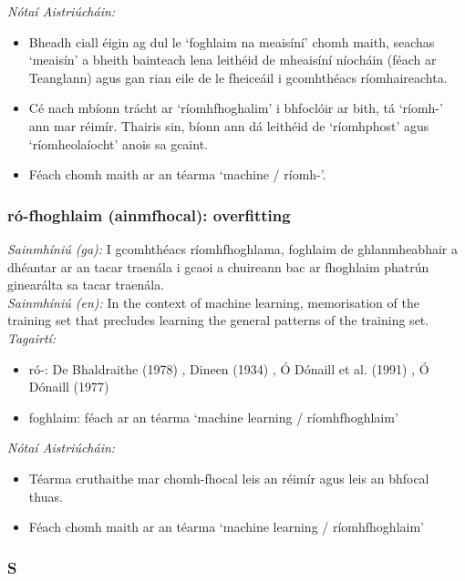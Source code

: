  \noindent \textit{Nótaí Aistriúcháin:}
\begin{itemize}
	\item Bheadh ciall éigin ag dul le `foghlaim na meaisíní' chomh maith, seachas `meaisín' a bheith bainteach lena leithéid de mheaisíní níocháin (féach ar Teanglann) agus gan rian eile de le fheiceáil i gcomhthéacs ríomhaireachta.
	\item Cé nach mbíonn trácht ar `ríomhfhoghalim' i bhfoclóir ar bith, tá `ríomh-' ann mar réimír. Thairis sin, bíonn ann dá leithéid de `ríomhphost' agus `ríomheolaíocht' anois sa gcaint.
	\item Féach chomh maith ar an téarma `machine / ríomh-'.
\end{itemize}


\subsubsection*{ró-fhoghlaim (ainmfhocal): overfitting}
 \noindent \textit{Sainmhíniú (ga):} I gcomhthéacs ríomhfhoghlama, foghlaim de ghlanmheabhair a dhéantar ar an tacar traenála i gcaoi a chuireann bac ar fhoghlaim phatrún ginearálta sa tacar traenála.
\\
 \noindent \textit{Sainmhíniú (en):} In the context of machine learning, memorisation of the training set that precludes learning the general patterns of the training set.
\\
 \noindent \textit{Tagairtí:}
\begin{itemize}
	\item ró-: De Bhaldraithe (1978) \cite{de-bhaldraithe}, Dineen (1934) \cite{dineen}, Ó Dónaill et al. (1991) \cite{focloir-beag}, Ó Dónaill (1977) \cite{odonaill}
	\item foghlaim: féach ar an téarma `machine learning / ríomhfhoghlaim'
\end{itemize}

 \noindent \textit{Nótaí Aistriúcháin:}
\begin{itemize}
	\item Téarma cruthaithe mar chomh-fhocal leis an réimír agus leis an bhfocal thuas.
	\item Féach chomh maith ar an téarma `machine learning / ríomhfhoghlaim'
\end{itemize}


 \subsubsection*{S}

